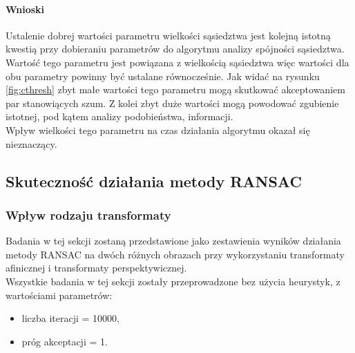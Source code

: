 \documentclass{article}
\begin{document}
	\paragraph{Wnioski}
	Ustalenie dobrej wartości parametru wielkości sąsiedztwa jest kolejną istotną kwestią przy dobieraniu parametrów do algorytmu analizy spójności sąsiedztwa. Wartość tego parametru jest powiązana z wielkością sąsiedztwa więc wartości dla obu parametry powinny być ustalane równocześnie.
	Jak widać na rysunku \ref{fig:cthresh} zbyt małe wartości tego parametru mogą skutkować akceptowaniem par stanowiących szum. Z kolei zbyt duże wartości mogą powodować zgubienie istotnej, pod kątem analizy podobieństwa, informacji.\\
	Wpływ wielkości tego parametru na czas działania algorytmu okazał się nieznaczący.
	\subsection{Skuteczność działania metody RANSAC}
	\subsubsection{Wpływ rodzaju transformaty}
	Badania w tej sekcji zostaną przedstawione jako zestawienia wyników działania metody RANSAC na dwóch różnych obrazach przy wykorzystaniu transformaty afinicznej i transformaty perspektywicznej.\\
	Wszystkie badania w tej sekcji zostały przeprowadzone bez użycia heurystyk, z wartościami parametrów:
	\begin{itemize}
		\item liczba iteracji = 10000,
		\item próg akceptacji = 1.
	\end{itemize}
	
\end{document}
